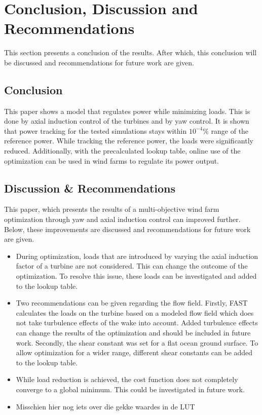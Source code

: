 \section{Conclusion, Discussion and Recommendations}
This section presents a conclusion of the results. After which, this conclusion will be discussed and recommendations for future work are given. 
\subsection{Conclusion}
This paper shows a model that regulates power while minimizing loads. This is done by axial induction control of the turbines and by yaw control. 
It is shown that power tracking for the tested simulations stays within $10^{-4}\%$ range of the reference power. While tracking the reference power, the loads were significantly reduced.
Additionally, with the precalculated lookup table, online use of the optimization can be used in wind farms to regulate its power output.
 

\subsection{Discussion \& Recommendations}
This paper, which presents the results of a multi-objective wind farm optimization through yaw and axial induction control can improved further. Below, these improvements are discussed and recommendations for future work are given.
\begin{itemize}
	\item During optimization, loads that are introduced by varying the axial induction factor of a turbine are not considered. This can change the outcome of the optimization. To resolve this issue, these loads can be investigated and added to the lookup table.
	\item Two recommendations can be given regarding the flow field. Firstly, FAST calculates the loads on the turbine based on a modeled flow field which does not take turbulence effects of the wake into account. Added turbulence effects can change the results of the optimization and should be included in future work. Secondly, the shear constant was set for a flat ocean ground surface. To allow optimization for a wider range, different shear constants can be added to the lookup table.
	\item While load reduction is achieved, the cost function does not completely converge to a global minimum. This could be investigated in future work.
	\item Misschien hier nog iets over die gekke waardes in de LUT
\end{itemize}

  
